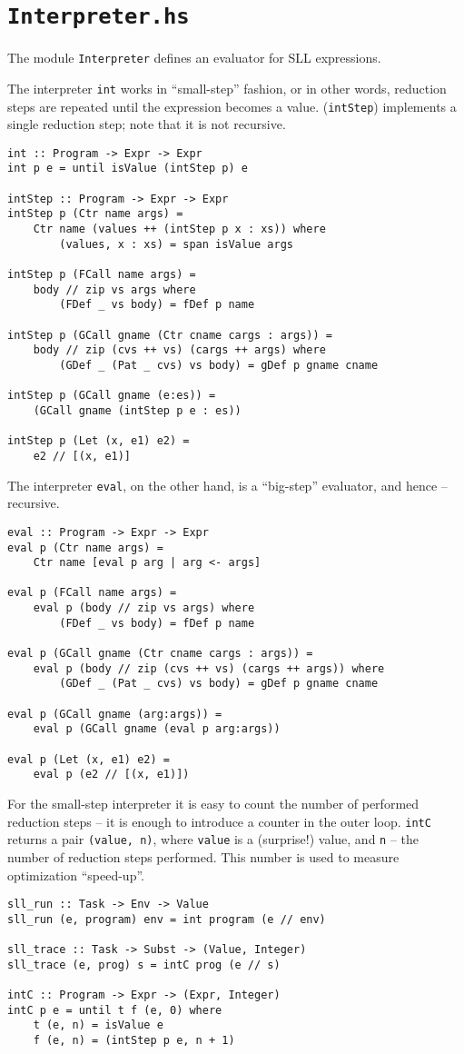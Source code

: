 \section{\texttt{Interpreter.hs}}
The module \texttt{Interpreter} defines an evaluator for SLL expressions.

The interpreter \texttt{int} works in ``small-step'' fashion, or in other words,
reduction steps are repeated until the expression becomes a value.
(\texttt{intStep}) implements a single reduction step; note that it is not recursive.
\begin{lstlisting}[name=interpreter]
int :: Program -> Expr -> Expr
int p e = until isValue (intStep p) e

intStep :: Program -> Expr -> Expr
intStep p (Ctr name args) =
	Ctr name (values ++ (intStep p x : xs)) where
		(values, x : xs) = span isValue args

intStep p (FCall name args) =
	body // zip vs args where
		(FDef _ vs body) = fDef p name

intStep p (GCall gname (Ctr cname cargs : args)) =
	body // zip (cvs ++ vs) (cargs ++ args) where
		(GDef _ (Pat _ cvs) vs body) = gDef p gname cname

intStep p (GCall gname (e:es)) =
	(GCall gname (intStep p e : es))

intStep p (Let (x, e1) e2) =
	e2 // [(x, e1)]
\end{lstlisting}

The interpreter \texttt{eval}, on the other hand, is a ``big-step'' evaluator,
and hence -- recursive.
\begin{lstlisting}[name=interpreter]
eval :: Program -> Expr -> Expr
eval p (Ctr name args) =
	Ctr name [eval p arg | arg <- args]

eval p (FCall name args) =
	eval p (body // zip vs args) where
		(FDef _ vs body) = fDef p name

eval p (GCall gname (Ctr cname cargs : args)) =
	eval p (body // zip (cvs ++ vs) (cargs ++ args)) where
		(GDef _ (Pat _ cvs) vs body) = gDef p gname cname

eval p (GCall gname (arg:args)) =
	eval p (GCall gname (eval p arg:args))

eval p (Let (x, e1) e2) =
	eval p (e2 // [(x, e1)])
\end{lstlisting}

For the small-step interpreter it is easy to count the number of performed reduction steps
-- it is enough to introduce a counter in the outer loop.
\texttt{intC} returns a pair \texttt{(value,~n)}, where \texttt{value} is a (surprise!) value,
and \texttt{n} -- the number of reduction steps performed.
This number is used to measure optimization ``speed-up''.
\begin{lstlisting}[name=interpreter]
sll_run :: Task -> Env -> Value
sll_run (e, program) env = int program (e // env)

sll_trace :: Task -> Subst -> (Value, Integer)
sll_trace (e, prog) s = intC prog (e // s)

intC :: Program -> Expr -> (Expr, Integer)
intC p e = until t f (e, 0) where
	t (e, n) = isValue e
	f (e, n) = (intStep p e, n + 1)
\end{lstlisting}

